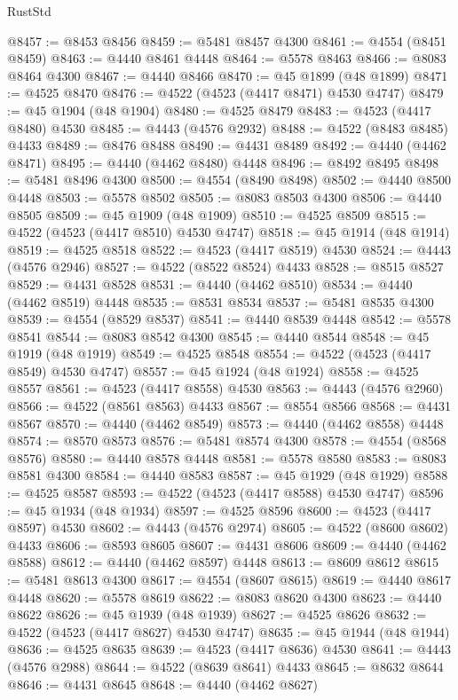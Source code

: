 \begin{lexlean}{RustStd}
\begin{coremodule}
@8457 := @8453 @8456
@8459 := @5481 @8457 @4300
@8461 := @4554 (@8451 @8459)
@8463 := @4440 @8461 @4448
@8464 := @5578 @8463
@8466 := @8083 @8464 @4300
@8467 := @4440 @8466
@8470 := @45 @1899 (@48 @1899)
@8471 := @4525 @8470
@8476 := @4522 (@4523 (@4417 @8471) @4530 @4747)
@8479 := @45 @1904 (@48 @1904)
@8480 := @4525 @8479
@8483 := @4523 (@4417 @8480) @4530
@8485 := @4443 (@4576 @2932)
@8488 := @4522 (@8483 @8485) @4433
@8489 := @8476 @8488
@8490 := @4431 @8489
@8492 := @4440 (@4462 @8471)
@8495 := @4440 (@4462 @8480) @4448
@8496 := @8492 @8495
@8498 := @5481 @8496 @4300
@8500 := @4554 (@8490 @8498)
@8502 := @4440 @8500 @4448
@8503 := @5578 @8502
@8505 := @8083 @8503 @4300
@8506 := @4440 @8505
@8509 := @45 @1909 (@48 @1909)
@8510 := @4525 @8509
@8515 := @4522 (@4523 (@4417 @8510) @4530 @4747)
@8518 := @45 @1914 (@48 @1914)
@8519 := @4525 @8518
@8522 := @4523 (@4417 @8519) @4530
@8524 := @4443 (@4576 @2946)
@8527 := @4522 (@8522 @8524) @4433
@8528 := @8515 @8527
@8529 := @4431 @8528
@8531 := @4440 (@4462 @8510)
@8534 := @4440 (@4462 @8519) @4448
@8535 := @8531 @8534
@8537 := @5481 @8535 @4300
@8539 := @4554 (@8529 @8537)
@8541 := @4440 @8539 @4448
@8542 := @5578 @8541
@8544 := @8083 @8542 @4300
@8545 := @4440 @8544
@8548 := @45 @1919 (@48 @1919)
@8549 := @4525 @8548
@8554 := @4522 (@4523 (@4417 @8549) @4530 @4747)
@8557 := @45 @1924 (@48 @1924)
@8558 := @4525 @8557
@8561 := @4523 (@4417 @8558) @4530
@8563 := @4443 (@4576 @2960)
@8566 := @4522 (@8561 @8563) @4433
@8567 := @8554 @8566
@8568 := @4431 @8567
@8570 := @4440 (@4462 @8549)
@8573 := @4440 (@4462 @8558) @4448
@8574 := @8570 @8573
@8576 := @5481 @8574 @4300
@8578 := @4554 (@8568 @8576)
@8580 := @4440 @8578 @4448
@8581 := @5578 @8580
@8583 := @8083 @8581 @4300
@8584 := @4440 @8583
@8587 := @45 @1929 (@48 @1929)
@8588 := @4525 @8587
@8593 := @4522 (@4523 (@4417 @8588) @4530 @4747)
@8596 := @45 @1934 (@48 @1934)
@8597 := @4525 @8596
@8600 := @4523 (@4417 @8597) @4530
@8602 := @4443 (@4576 @2974)
@8605 := @4522 (@8600 @8602) @4433
@8606 := @8593 @8605
@8607 := @4431 @8606
@8609 := @4440 (@4462 @8588)
@8612 := @4440 (@4462 @8597) @4448
@8613 := @8609 @8612
@8615 := @5481 @8613 @4300
@8617 := @4554 (@8607 @8615)
@8619 := @4440 @8617 @4448
@8620 := @5578 @8619
@8622 := @8083 @8620 @4300
@8623 := @4440 @8622
@8626 := @45 @1939 (@48 @1939)
@8627 := @4525 @8626
@8632 := @4522 (@4523 (@4417 @8627) @4530 @4747)
@8635 := @45 @1944 (@48 @1944)
@8636 := @4525 @8635
@8639 := @4523 (@4417 @8636) @4530
@8641 := @4443 (@4576 @2988)
@8644 := @4522 (@8639 @8641) @4433
@8645 := @8632 @8644
@8646 := @4431 @8645
@8648 := @4440 (@4462 @8627)

\end{coremodule}
\end{lexlean}
